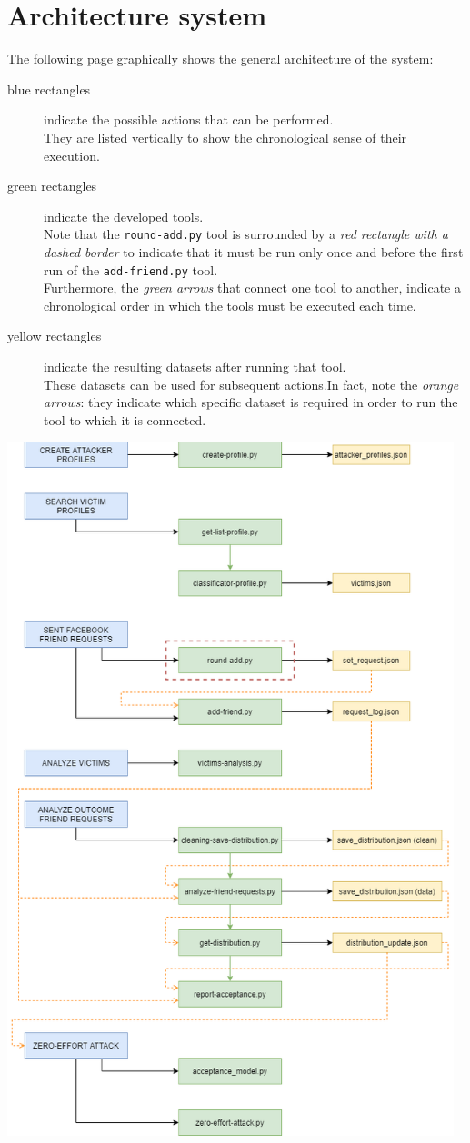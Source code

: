 \section{Architecture system}
The following page graphically shows the general architecture of the system:
\begin{description}
	\item[blue rectangles] indicate the possible actions that can be performed.\\They are listed vertically to show the chronological sense of their execution.
	\item[green rectangles] indicate the developed tools.\\Note that the \texttt{round-add.py} tool is surrounded by a \textit{red rectangle with a dashed border} to indicate that it must be run only once and before the first run of the \texttt{add-friend.py} tool. \\Furthermore, the \textit{green arrows} that connect one tool to another, indicate a chronological order in which the tools must be executed each time.
	\item[yellow rectangles] indicate the resulting datasets after running that tool.\\These datasets can be used for subsequent actions.In fact, note the \textit{orange arrows}: they indicate which specific dataset is required in order to run the tool to which it is connected.
\end{description}
\newpage
\begin{center}
	\includegraphics[width=13cm]{immagini/architecture-system.png} 
\end{center}
